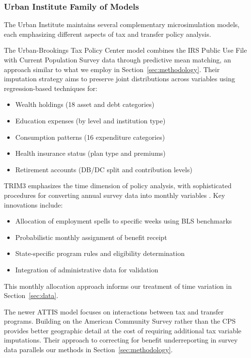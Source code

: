 \subsubsection{Urban Institute Family of Models}

The Urban Institute maintains several complementary microsimulation models, each emphasizing different aspects of tax and transfer policy analysis.

The Urban-Brookings Tax Policy Center model \citep{tpc2022} combines the IRS Public Use File with Current Population Survey data through predictive mean matching, an approach similar to what we employ in Section~\ref{sec:methodology}. Their imputation strategy aims to preserve joint distributions across variables using regression-based techniques for:

\begin{itemize}
    \item Wealth holdings (18 asset and debt categories)
    \item Education expenses (by level and institution type)
    \item Consumption patterns (16 expenditure categories)
    \item Health insurance status (plan type and premiums)
    \item Retirement accounts (DB/DC split and contribution levels)
\end{itemize}

TRIM3 emphasizes the time dimension of policy analysis, with sophisticated procedures for converting annual survey data into monthly variables \citep{trim2024}. Key innovations include:

\begin{itemize}
    \item Allocation of employment spells to specific weeks using BLS benchmarks
    \item Probabilistic monthly assignment of benefit receipt
    \item State-specific program rules and eligibility determination
    \item Integration of administrative data for validation
\end{itemize}

This monthly allocation approach informs our treatment of time variation in Section~\ref{sec:data}.

The newer ATTIS model \citep{attis2024} focuses on interactions between tax and transfer programs. Building on the American Community Survey rather than the CPS provides better geographic detail at the cost of requiring additional tax variable imputations. Their approach to correcting for benefit underreporting in survey data parallels our methods in Section~\ref{sec:methodology}.

